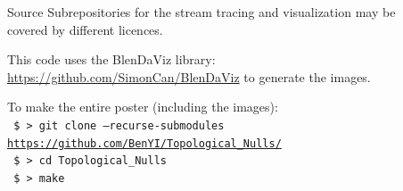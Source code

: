 \documentclass[final]{beamer}
\newlength{\sepwid}
\newlength{\onecolwid}
\begin{document}
\begin{frame}[t]
\begin{columns}[t]
\begin{column}{\onecolwid}
\begin{block}{Source}
Subrepositories for the stream tracing and visualization may be covered by different licences. 

This code uses the BlenDaViz library: \url{https://github.com/SimonCan/BlenDaViz} to generate the images. 

    To make the entire poster (including the images):\\
\texttt{
	\$ > git clone --recurse-submodules  \url{https://github.com/BenYI/Topological_Nulls/}}\\
\texttt{
    \$ > cd Topological\_Nulls\\
  }
\texttt{
    \$ > make
  }


\end{block}

\end{column}

\begin{column}{\sepwid}\end{column} %


\end{columns} %

\end{frame} %
\end{document}
